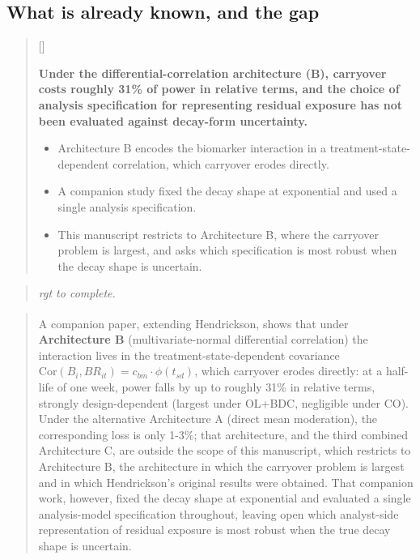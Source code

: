 \documentclass[
  11pt,
]{article}
\newcounter{pgraph}
\newenvironment{bullets}{%
  \stepcounter{pgraph}%
  \begin{quote}\small\sffamily\color[gray]{0.30}%
  {\normalfont\scriptsize\color[gray]{0.58}[\thepgraph]\enspace}}{%
  \end{quote}}
\newenvironment{rgt}{%
  \begin{quote}\small\itshape\color[RGB]{20,60,160}}{%
  \end{quote}}
\newenvironment{orig}{%
  \begin{quote}\normalsize\color[gray]{0.55}}{%
  \end{quote}}
\begin{document}
\subsection{What is already known, and the gap}\label{what-is-already-known-and-the-gap}

\begin{bullets}

\textbf{Under the differential-correlation architecture (B), carryover
costs roughly 31\% of power in relative terms, and the choice of
analysis specification for representing residual exposure has not
been evaluated against decay-form uncertainty.}

\begin{itemize}\setlength{\itemsep}{2pt}\setlength{\parskip}{0pt}
\item Architecture B encodes the biomarker interaction in a
treatment-state-dependent correlation, which carryover erodes
directly.
\item A companion study fixed the decay shape at exponential and
used a single analysis specification.
\item This manuscript restricts to Architecture B, where the
carryover problem is largest, and asks which specification is most
robust when the decay shape is uncertain.
\end{itemize}

\end{bullets}

\begin{rgt}
rgt to complete.

\end{rgt}

\begin{orig}
A companion paper\textsuperscript{}, extending
Hendrickson\textsuperscript{}, shows that under \textbf{Architecture B}
(multivariate-normal differential correlation) the interaction lives
in the treatment-state-dependent covariance
\(\text{Cor}(B_i, BR_{it}) = c_{bm} \cdot \phi(t_{sd})\), which
carryover erodes directly: at a half-life of one week, power falls
by up to roughly 31\% in relative terms, strongly design-dependent
(largest under OL+BDC, negligible under CO). Under the alternative
Architecture A (direct mean moderation), the corresponding loss is
only 1-3\%; that architecture, and the third combined Architecture C,
are outside the scope of this manuscript, which restricts to
Architecture B, the architecture in which the carryover problem is
largest and in which Hendrickson's original results were obtained.
That companion work, however, fixed the decay shape at exponential
and evaluated a single analysis-model specification throughout,
leaving open which analyst-side representation of residual exposure
is most robust when the true decay shape is uncertain.

\end{orig}
\end{document}
